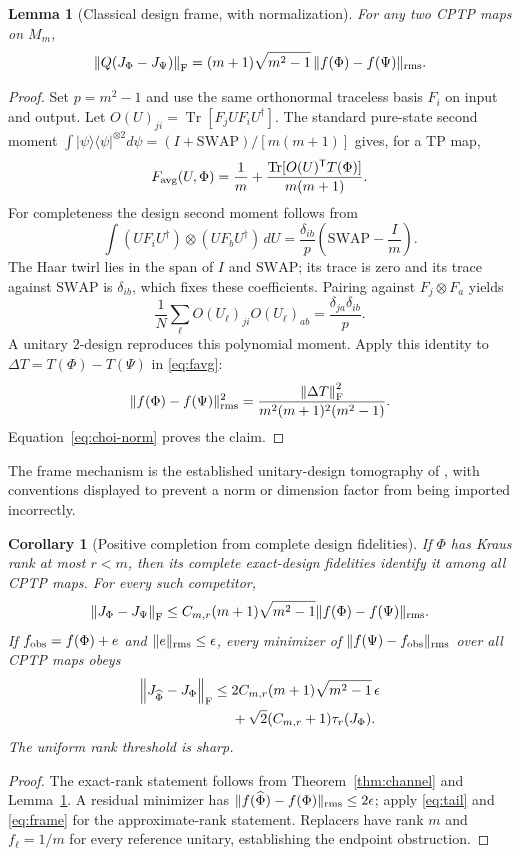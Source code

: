 \documentclass[11pt,a4paper]{article}
\newtheorem{lemma}[theorem]{Lemma}
\newtheorem{corollary}[theorem]{Corollary}
\newcommand{\Tr}{\operatorname{Tr}}
\newcommand{\F}{\mathrm F}
\newcommand{\norm}[1]{\left\lVert#1\right\rVert_{\F}}
\begin{document}
\begin{lemma}[Classical design frame, with normalization]\label{lem:agf}
For any two CPTP maps on $M_m$,
\begin{equation}\label{eq:frame}
 \norm{Q(J_\Phi-J_\Psi)}
 =(m+1)\sqrt{m^2-1}\,\|f(\Phi)-f(\Psi)\|_{\rm rms}.
\end{equation}
\end{lemma}
\begin{proof}
Set $p=m^2-1$ and use the same orthonormal traceless basis $F_i$ on
input and output. Let $O(U)_{ji}=\Tr[F_jUF_iU^\dagger]$.
The standard pure-state second moment
$\int|\psi\rangle\langle\psi|^{\otimes2}d\psi
=(I+\mathrm{SWAP})/[m(m+1)]$ gives, for a TP map,
\begin{equation}\label{eq:favg}
 F_{\rm avg}(U,\Phi)=\frac1m+
 \frac{\Tr[O(U)^{\mathsf T}T(\Phi)]}{m(m+1)}.
\end{equation}
For completeness the design second moment follows from
\[
 \int(UF_iU^\dagger)\otimes(UF_bU^\dagger)\,dU
 =\frac{\delta_{ib}}{p}\left(\mathrm{SWAP}-\frac Im\right).
\]
The Haar twirl lies in the span of $I$ and $\mathrm{SWAP}$; its trace
is zero and its trace against $\mathrm{SWAP}$ is $\delta_{ib}$, which
fixes these coefficients. Pairing against $F_j\otimes F_a$ yields
\[
 \frac1N\sum_\ell O(U_\ell)_{ji}O(U_\ell)_{ab}
 =\frac{\delta_{ja}\delta_{ib}}p .
\]
A unitary $2$-design reproduces this polynomial moment. Apply this
identity to $\Delta T=T(\Phi)-T(\Psi)$ in \eqref{eq:favg}:
\[
 \|f(\Phi)-f(\Psi)\|_{\rm rms}^2
 =\frac{\norm{\Delta T}^2}{m^2(m+1)^2(m^2-1)}.
\]
Equation~\eqref{eq:choi-norm} proves the claim.
\end{proof}

The frame mechanism is the established unitary-design tomography of
\cite{roth}, with conventions displayed to prevent a norm or dimension
factor from being imported incorrectly.

\begin{corollary}[Positive completion from complete design fidelities]
\label{cor:agf}
If $\Phi$ has Kraus rank at most $r<m$, then its complete exact-design
fidelities identify it among all CPTP maps. For every such competitor,
\[
 \norm{J_\Phi-J_\Psi}
 \le C_{m,r}(m+1)\sqrt{m^2-1}
             \|f(\Phi)-f(\Psi)\|_{\rm rms}.
\]
If $f_{\rm obs}=f(\Phi)+e$ and $\|e\|_{\rm rms}\le\epsilon$, every
minimizer of $\|f(\Psi)-f_{\rm obs}\|_{\rm rms}$ over all CPTP maps obeys
\begin{align}
 \norm{J_{\widehat\Phi}-J_\Phi}
 \le{}&2C_{m,r}(m+1)\sqrt{m^2-1}\,\epsilon \notag\\
 &+\sqrt2(C_{m,r}+1)\tau_r(J_\Phi). \label{eq:agf-noise}
\end{align}
The uniform rank threshold is sharp.
\end{corollary}
\begin{proof}
The exact-rank statement follows from
Theorem~\ref{thm:channel} and Lemma~\ref{lem:agf}.
A residual minimizer has
$\|f(\widehat\Phi)-f(\Phi)\|_{\rm rms}\le2\epsilon$;
apply \eqref{eq:tail} and \eqref{eq:frame} for the approximate-rank
statement. Replacers have rank $m$ and $f_\ell=1/m$ for every
reference unitary, establishing the endpoint obstruction.
\end{proof}
\end{document}
